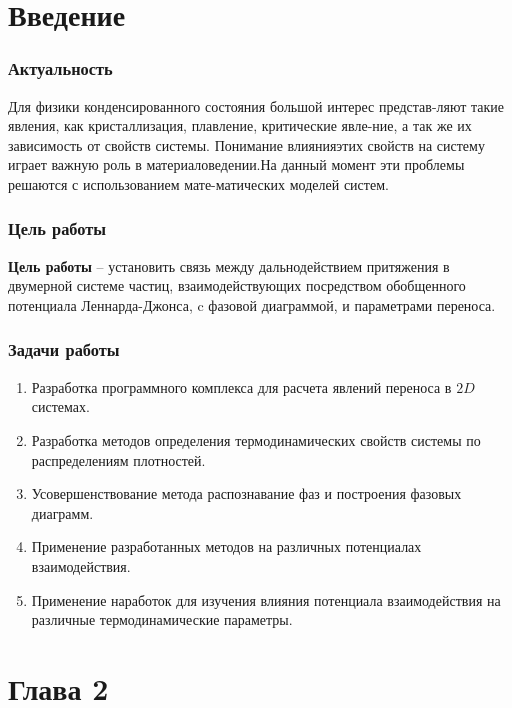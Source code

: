 \documentclass[pdf,hyperref={unicode}]{beamer}
\begin{document}
\section{Введение}



\begin{frame}
	\transdissolve[duration=0.2]
	\frametitle{Актуальность}
	
	Для физики конденсированного состояния большой интерес представ-ляют такие явления, как кристаллизация, плавление, критические явле-ние, а так же их зависимость от свойств системы. Понимание влиянияэтих свойств на систему играет важную роль в материаловедении.На данный момент эти проблемы решаются с использованием мате-матических моделей систем.
	
\end{frame}

\begin{frame}
	\transdissolve[duration=0.2]
	\frametitle{Цель работы}
	
	\textbf{Цель работы} --
установить связь между дальнодействием притяжения в двумерной системе частиц, взаимодействующих посредством обобщенного потенциала Леннарда-Джонса, c фазовой диаграммой, и параметрами переноса.
	
\end{frame}



\begin{frame}
	\transdissolve[duration=0.2]
	\frametitle{Задачи работы}
	\footnotesize{
\begin{enumerate}
\item Разработка программного комплекса для расчета явлений переноса в $2D$ системах.
\item Разработка методов определения термодинамических свойств системы по распределениям плотностей. 
\item Усовершенствование метода распознавание фаз и построения фазовых диаграмм.
\item Применение разработанных методов на различных потенциалах взаимодействия.
\item Применение наработок для изучения влияния потенциала взаимодействия на различные термодинамические параметры.
\end{enumerate}
	}
\end{frame}




\section{Глава 2}
\end{document}
